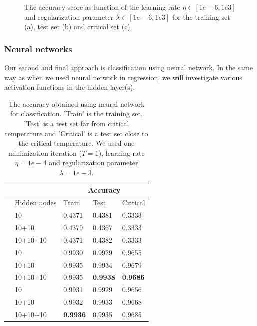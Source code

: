 \begin{figure} [H]
	\caption{The accuracy score as function of the learning rate $\eta\in[1e-6,1e3]$ and regularization parameter $\lambda\in[1e-6,1e3]$ for the training set (a), test set (b) and critical set (c).}%
	\label{fig:class_logistic}
\end{figure}
\restoregeometry

\subsubsection{Neural networks}
Our second and final approach is classification using neural network. In the same way as when we used neural network in regression, we will investigate various activation functions in the hidden layer(s). 
\begin{table} [H]
	\caption{The accuracy obtained using neural network for classification. 'Train' is the training set, 'Test' is a test set far from critical temperature and 'Critical' is a test set close to the critical temperature. We used one minimization iteration ($T=1$), learning rate $\eta=1e-4$ and regularization parameter $\lambda=1e-3$.}
	\begin{tabularx}{\textwidth}{l|l|XXX} \hline\hline
		\label{tab:nn_class}
		&& \multicolumn{3}{c}{\textbf{Accuracy}}\\ \hline
		&Hidden nodes&Train&Test&Critical\\ \hline
		
		\parbox[t]{2mm}{}
		&10 & 0.4371 & 0.4381 & 0.3333 \\
		&10+10 & 0.4379 & 0.4367 & 0.3333 \\
		&10+10+10 & 0.4371 & 0.4382 & 0.3333 \\ \hline
		
		\parbox[t]{2mm}{}
		&10 & 0.9930 & 0.9929 & 0.9655 \\
		&10+10 & 0.9935 & 0.9934 & 0.9679 \\
		&10+10+10 & 0.9935 & \textbf{0.9938} & \textbf{0.9686} \\ \hline
		
		\parbox[t]{2mm}{}
		&10 & 0.9931 & 0.9929 & 0.9656 \\
		&10+10 & 0.9932 & 0.9933 & 0.9668 \\
		&10+10+10 & \textbf{0.9936} & 0.9935 & 0.9685 \\ \hline\hline
	\end{tabularx}
\end{table}

